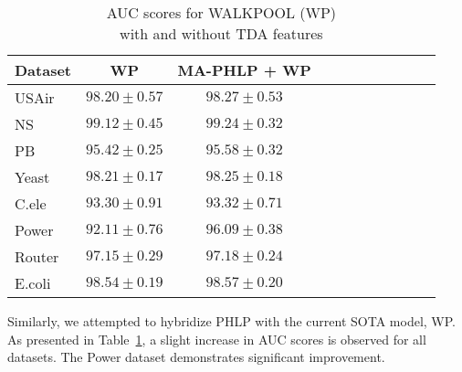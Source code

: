 \begin{table}[ht!]
\centering
\caption{AUC scores for WALKPOOL (WP) \\ with and without TDA features}
\begin{tabular}{l|cccccccccc}
\toprule
Dataset & WP & MA-PHLP + WP \\
\midrule
USAir & $ 98.20\pm0.57 $ & $\mathbf{98.27} \pm \mathbf{0.53}$ \\
NS & $ 99.12\pm0.45 $ & $\mathbf{99.24} \pm \mathbf{0.32}$ \\
PB & $ 95.42\pm0.25 $ & $\mathbf{95.58} \pm \mathbf{0.32}$ \\
Yeast & $ 98.21\pm0.17 $ & $\mathbf{98.25} \pm \mathbf{0.18}$ \\
C.ele & $ 93.30\pm0.91 $ & $\mathbf{93.32} \pm \mathbf{0.71}$ \\ 
Power & $ 92.11\pm0.76 $ & $\mathbf{96.09} \pm \mathbf{0.38}$ \\
Router & $ 97.15\pm0.29 $ & $\mathbf{97.18} \pm \mathbf{0.24}$ \\
E.coli & $ 98.54\pm0.19 $ & $\mathbf{98.57} \pm \mathbf{0.20}$ \\
\bottomrule
\end{tabular}\label{tbl:PHLP+WP}
\end{table}
Similarly, we attempted to hybridize PHLP with the current SOTA model, WP. 
As presented in Table~\ref{tbl:PHLP+WP}, a slight increase in AUC scores is observed for all datasets. The Power dataset demonstrates significant improvement.


